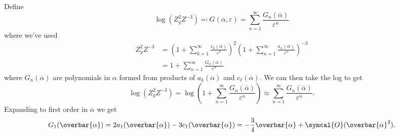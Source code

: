 \documentclass[fleqn]{NotesClass}
\newcommand{\order}{\symcal{O}}
\begin{document}
    Define
    \begin{equation}
        \log(Z_g^2 Z^{-3}) \eqqcolon G(\overbar{\alpha}, \varepsilon) = \sum_{n=1}^{\infty} \frac{G_n(\overbar{\alpha})}{\varepsilon^n}
    \end{equation}
    where we've used
    \begin{align}
        Z_g^2 Z^{-3} &= \left( 1 + \sum_{k=1}^{\infty} \frac{c_k(\overbar{\alpha})}{\varepsilon^k} \right)^2 \left( 1 + \sum_{n=1}^{\infty} \frac{a_n(\overbar{\alpha})}{\varepsilon^n} \right)^{-3}\\
        &= 1 + \sum_{n=1}^{\infty} \frac{G_n(\overbar{\alpha})}{\varepsilon^n}
    \end{align}
    where \(G_n(\overbar{\alpha})\) are polynomials in \(\alpha\) formed from products of \(a_k(\overbar{\alpha})\) and \(c_{\ell}(\overbar{\alpha})\).
    We can then take the log to get
    \begin{equation}
        \log(Z_g^2 Z^{-3}) = \log\left( 1 + \sum_{n=1}^{\infty} \frac{G_n(\overbar{\alpha})}{\varepsilon^n} \right) \approx \sum_{n=1}^{\infty} \frac{G_n(\overbar{\alpha})}{\varepsilon^n}.
    \end{equation}
    Expanding to first order in \(\overbar{\alpha}\) we get
    \begin{equation}
        G_1(\overbar{\alpha}) = 2a_1(\overbar{\alpha}) - 3c_1(\overbar{\alpha}) = -\frac{3}{4}\overbar{\alpha} + \order(\overbar{\alpha}^2).
    \end{equation}
    
\end{document}
